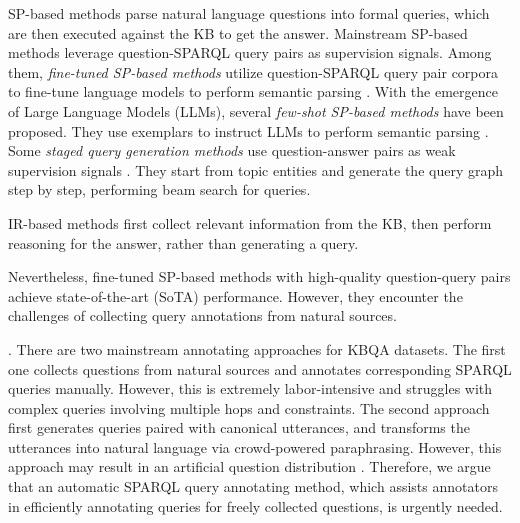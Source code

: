 \documentclass[runningheads]{llncs}
\begin{document}
SP-based methods parse natural language questions into formal queries, which are then executed against the KB to get the answer.
Mainstream SP-based methods leverage question-SPARQL query pairs as supervision signals. Among them, \textit{fine-tuned SP-based methods} utilize question-SPARQL query pair corpora to fine-tune language models to perform semantic parsing \cite{gu2023pangu,hu2022gmt,shu2022tiara,ye2022rng}.%
With the emergence of Large Language Models (LLMs), several \textit{few-shot SP-based methods} have been proposed. They use exemplars to instruct LLMs to perform semantic parsing \cite{huang2024queryagent,jiang2025kgagent,li2023binder}. 
Some \textit{staged query generation methods} use question-answer pairs as weak supervision signals \cite{lan2020qgg,yih2015semantic}. They start from topic entities and generate the query graph step by step, performing beam search for queries.

IR-based methods \cite{ding2024epr,jiang2023reasoningLM,luo2023reasoning} first collect relevant information from the KB, then perform reasoning for the answer, rather than generating a query.


Nevertheless, fine-tuned SP-based methods with high-quality question-query pairs achieve state-of-the-art (SoTA) performance.
However, they encounter the challenges of collecting query annotations from natural sources.

.
There are two mainstream annotating approaches for KBQA datasets. 
The first one collects questions from natural sources and annotates corresponding SPARQL queries manually. However, this is extremely labor-intensive and struggles with complex queries involving multiple hops and constraints.
The second approach \cite{wang2015building} first generates queries paired with canonical utterances, and transforms the utterances into natural language via crowd-powered paraphrasing. 
However, this approach may result in an artificial question distribution \cite{talmor2018web}.
Therefore, we argue that an automatic SPARQL query annotating method, which assists annotators in efficiently annotating queries for freely collected questions, is urgently needed.
\end{document}
